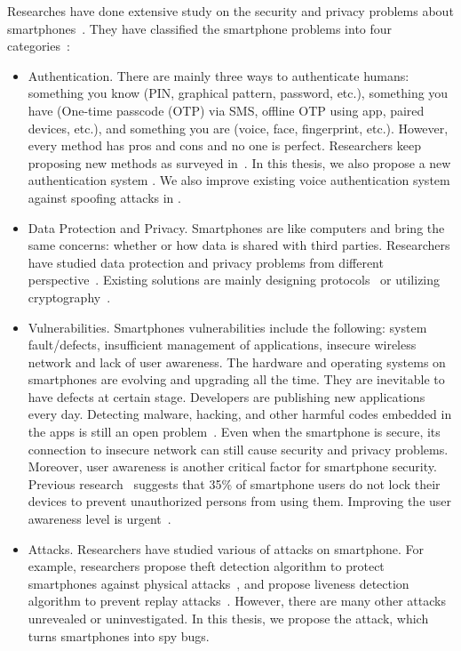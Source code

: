 Researches have done extensive study on the security and privacy problems about smartphones~\cite{ali2019security,zaidi2016survey,chin2012measuring,khan2015survey}. They have classified the smartphone problems into four categories~\cite{zaidi2016survey}:

\begin{itemize}
	\item Authentication. There are mainly three ways to authenticate humans: something you know (PIN, graphical pattern, password, etc.), something you have (One-time passcode (OTP) via SMS, offline OTP using app, paired devices, etc.), and something you are (voice, face, fingerprint, etc.). However, every method has pros  and cons and no one is perfect. Researchers keep proposing new methods as surveyed in~\cite{teh2016survey,spolaor2016biometric,mahfouz2017survey,vongsingthong2015survey,gupta2018demystifying}.  In this thesis, we also propose a new authentication system {\uu}. We also improve existing voice authentication system against spoofing attacks in {\mv}.
	
	\item  Data Protection and Privacy. Smartphones are like computers and bring the same concerns: whether or how data is shared with third parties. Researchers have studied data protection and privacy problems from different perspective~\cite{muslukhov2012understanding,boyles2012privacy,wang2015know}. Existing solutions are mainly designing protocols~\cite{zegers2015lightweight,urien2013framework} or utilizing cryptography~\cite{patel2016integrated,han2016enhancing}.
	
	\item Vulnerabilities. Smartphones vulnerabilities include the following: system fault/defects, insufficient management of applications, insecure wireless network and lack of user awareness. The hardware and operating systems on smartphones are evolving and upgrading all the time. They are inevitable to have defects at certain stage. Developers are publishing new applications every day. Detecting malware, hacking, and other harmful codes embedded in the apps is still an open problem~\cite{idrees2017pindroid}. Even when the smartphone is secure, its connection to insecure network can still cause security and privacy problems. Moreover, user awareness is another critical factor for smartphone security. Previous research~\cite{van2013modifying} suggests that 35\% of smartphone users do not lock their devices to prevent unauthorized persons from using them. Improving the user awareness level is urgent~\cite{koyuncu2019security}.
	
	\item Attacks. Researchers have studied various of attacks on smartphone. For example, researchers propose theft detection algorithm to protect smartphones against physical attacks~\cite{chang2016smartdog}, and propose liveness detection algorithm to prevent replay attacks~\cite{zhang2016voicelive}.  However, there are many other attacks unrevealed or uninvestigated.  In this thesis, we propose the {\attackName} attack, which turns smartphones into spy bugs. 
\end{itemize}




